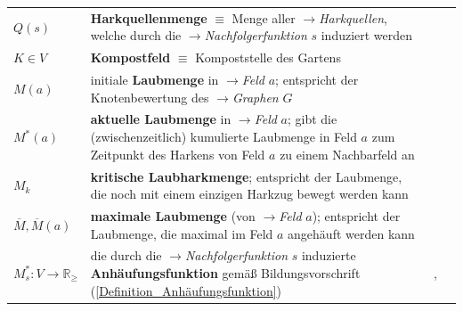 \begin{tabular}{lp{12cm}cm{1cm}}
$Q(s)$
& \textbf{Harkquellenmenge} $\equiv$ Menge aller $\rightarrow$\textit{Harkquellen}, welche durch die $\rightarrow$\textit{Nachfolgerfunktion} $s$ induziert werden 
& \pageref{Harkquellenmenge}\\

$K \in V$
& \textbf{Kompostfeld} $\equiv$ Kompoststelle des Gartens
& \pageref{Kompostfeld}\\

$M(a)$ 
& initiale \textbf{Laubmenge} in $\rightarrow$\textit{Feld} $a$; entspricht der Knotenbewertung des  $\rightarrow$\textit{Graphen} $G$
& \pageref{Laubmenge}\\

$M^*(a)$
& \textbf{aktuelle Laubmenge} in $\rightarrow$\textit{Feld} $a$; gibt die (zwischenzeitlich) kumulierte Laubmenge in Feld $a$ zum Zeitpunkt des Harkens von Feld $a$ zu einem Nachbarfeld an
& \pageref{aktuelle Laubmenge}\\

$M_k$
& \textbf{kritische Laubharkmenge}; entspricht der Laubmenge, die noch mit einem einzigen Harkzug bewegt werden kann
& \pageref{kritische Laubharkmenge}\\

$\overline{M}, \overline{M}(a)$
& \textbf{maximale Laubmenge} (von $\rightarrow$\textit{Feld} $a$); entspricht der Laubmenge, die maximal im Feld $a$ angehäuft werden kann
& \pageref{maximale Laubmenge}\\

$M^*_s:V \rightarrow \mathbb{R}_\geq$
& die durch die $\rightarrow$\textit{Nachfolgerfunktion} $s$ induzierte \textbf{Anhäufungsfunktion} gemäß Bildungsvorschrift (\ref{Definition_Anhäufungsfunktion})
& \pageref{Anhäufungsfunktion},\pageref{Anhäufungsfunktion_2} \\
\end{tabular}



